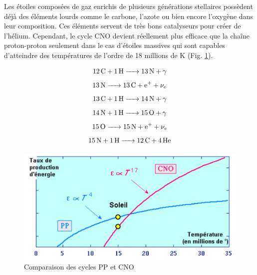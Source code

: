 Les étoiles composées de gaz enrichis de plusieurs générations stellaires possèdent déjà des éléments lourds comme le carbone, l’azote ou bien encore l’oxygène dans leur composition. Ces éléments servent de très bons catalyseurs pour créer de l’hélium. Cependant, le cycle CNO devient réellement plus efficace que la chaîne proton-proton seulement dans le cas d'étoiles massives qui sont capables d'atteindre des températures de l'ordre de 18 millions de K (Fig. \ref{Fig. 2.1}). 


\begin{equation}\ce{\ce{12C} + \ce{1H} -> \ce{13N} +$\gamma$}\label{Eq. 2.4}\end{equation}				     	
\begin{equation}\ce{\ce{13N} -> \ce{13C} + \ce{e+} + $\nu_{e}$ }\label{Eq. 2.5}\end{equation}					   	
\begin{equation}\ce{\ce{13C} + \ce{1H} -> \ce{14N} + $\gamma$ }\label{Eq. 2.6}\end{equation}	
\begin{equation}\ce{\ce{14N} + \ce{1H} -> \ce{15O} + $\gamma$}\label{Eq. 2.7}\end{equation}\newpage\vspace{2cm}		
\begin{equation}\ce{\ce{15O} -> \ce{15N} + \ce{e+} + $\nu_{e}$	}\label{Eq. 2.8}\end{equation}
\begin{equation}\ce{\ce{15N} + \ce{1H} -> \ce{12C} + \ce{4He}}\label{Eq. 2.9}\end{equation}\smallskip

\begin{figure}[H]
	\centering
	\includegraphics[scale=0.8]{images/cno-pp}
	\caption[Comparaison des cycles PP et CNO]{Comparaison des cycles PP et CNO}
	\label{Fig. 2.1}
\end{figure}\bigskip

